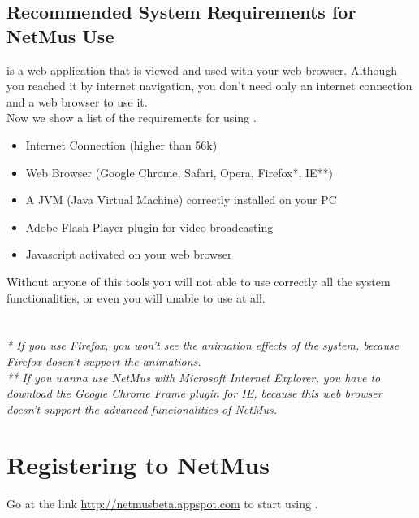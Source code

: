 \subsection{Recommended System Requirements for NetMus Use}
 is a web application that is viewed and used with your web browser.
Although you reached it by internet navigation, you don't need only an internet
connection and a web browser to use it.\\

Now we show a list of the requirements for using .

\begin{itemize}
  \item Internet Connection (higher than 56k)
  \item Web Browser (Google Chrome, Safari, Opera, Firefox*, IE**)
  \item A JVM (Java Virtual Machine) correctly installed on your PC
  \item Adobe Flash Player plugin for video broadcasting
  \item Javascript activated on your web browser
\end{itemize}

Without anyone of this tools you will not able to use
correctly all the system functionalities, or even you will unable to use
 at all.\\
\\
\\

\emph{* If you use Firefox, you won't see the animation effects of the
system, because Firefox dosen't support the animations.}\\ 
\emph{** If you wanna use NetMus with Microsoft Internet Explorer, you have to
download the Google Chrome Frame plugin for IE, because this web browser doesn't
support the advanced funcionalities of NetMus.}\\

\section{Registering to NetMus}

Go at the link \url{http://netmusbeta.appspot.com} to start using .\\

